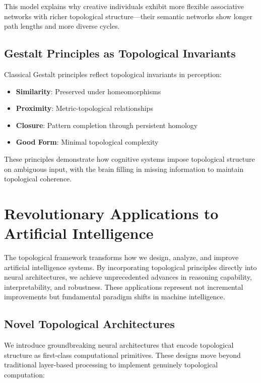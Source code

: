 \documentclass[11pt]{article}
\begin{document}
This model explains why creative individuals exhibit more flexible associative networks with richer topological structure—their semantic networks show longer path lengths and more diverse cycles.

\subsection{Gestalt Principles as Topological Invariants}

Classical Gestalt principles reflect topological invariants in perception:

\begin{itemize}
\item \textbf{Similarity}: Preserved under homeomorphisms
\item \textbf{Proximity}: Metric-topological relationships
\item \textbf{Closure}: Pattern completion through persistent homology
\item \textbf{Good Form}: Minimal topological complexity
\end{itemize}

These principles demonstrate how cognitive systems impose topological structure on ambiguous input, with the brain filling in missing information to maintain topological coherence.

\section{Revolutionary Applications to Artificial Intelligence}

The topological framework transforms how we design, analyze, and improve artificial intelligence systems. By incorporating topological principles directly into neural architectures, we achieve unprecedented advances in reasoning capability, interpretability, and robustness. These applications represent not incremental improvements but fundamental paradigm shifts in machine intelligence.

\subsection{Novel Topological Architectures}

We introduce groundbreaking neural architectures that encode topological structure as first-class computational primitives. These designs move beyond traditional layer-based processing to implement genuinely topological computation:
\end{document}
